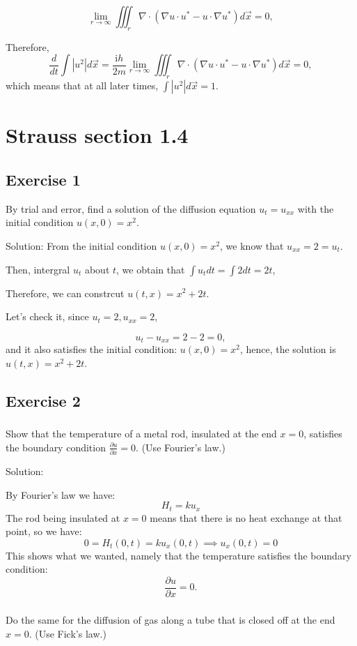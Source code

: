 \documentclass{article}
\begin{document}
		\[ \lim_{r \to \infty}\iiint_{r}^{} \nabla \cdot (\nabla u \cdot u^* -u\cdot \nabla u^*)d \vec{x } =0,\]

		Therefore, \[ \frac{d}{dt}\int \left | u^2 \right | d \vec{x }=\frac{\mathrm{i}h}{2m}\lim_{r \to \infty}\iiint_{r}^{} \nabla \cdot (\nabla u \cdot u^* -u\cdot \nabla u^*)d \vec{x }=0,\]
			which means that at all later times, $ \int \left | u^2 \right | d \vec{x } =1$.
		
\section{Strauss section 1.4}
\subsection{Exercise 1}
By trial and error, find a solution of the diffusion equation $u_t=u_{xx}$ with the initial condition $u(x,0)=x^2.$
		
		Solution: From the initial condition $u(x,0)=x^2$, we know that $u_{xx}=2=u_t$. 
		
		Then, intergral $u_{t}$ about $t$, we obtain that $\int u_{t} dt= \int 2 dt = 2t$,

		Therefore, we can constrcut $u(t,x)=x^2+2t$.

		Let's check it, since $u_{t}=2, u_{xx}=2$,

		\[u_{t}-u_{xx}=2-2=0,\] and it also satisfies the initial condition: $u(x,0)=x^2$, hence, the solution is $u(t,x)=x^2+2t$.

		\subsection{Exercise 2}
		\subsubsection{}
		Show that the temperature of a metal rod,
			insulated at the end $x=0$, satisfies the boundary
			condition $\frac{\partial u}{\partial x} =0$. (Use
		Fourier's law.)

			Solution:

			By Fourier's law we have:
			\[
				H_t = ku_x
			\]
			The rod being insulated at $x=0$ means that there is no
			heat exchange at that point, so we have:
			\[
				0 = H_t(0,t) = ku_x(0,t) \implies u_x(0,t) =0
			\]
			This shows what we wanted, namely that the temperature
			satisfies the boundary condition:
			\[
				\frac{\partial u}{\partial x} =0.
			\]
		\subsubsection{}
		Do the same for the diffusion of gas along a tube that is closed off at the end $x=0$. (Use Fick's law.)
		
\end{document}
